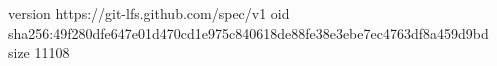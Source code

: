 version https://git-lfs.github.com/spec/v1
oid sha256:49f280dfe647e01d470cd1e975c840618de88fe38e3ebe7ec4763df8a459d9bd
size 11108
